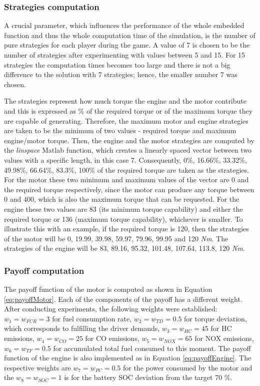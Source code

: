 \subsubsection{Strategies computation}
A crucial parameter, which influences the performance of the whole embedded function and thus the whole computation time of the simulation, is the number of pure strategies for each player during the game. A value of 7 is chosen to be the number of strategies after experimenting with values between 5 and 15. For 15 strategies the computation times becomes too large and there is not a big difference to the solution with 7 strategies; hence, the smaller number 7 was chosen.

The strategies represent how much torque the engine and the motor contribute and this is expressed as \% of the required torque or of the maximum torque they are capable of generating. Therefore, the maximum motor and engine strategies are taken to be the minimum of two values - required torque and maximum engine/motor torque. Then, the engine and the motor strategies are computed by the \textit{linspace} Matlab function, which creates a linearly spaced vector between two values with a specific length, in this case 7. Consequently, 0\%, 16.66\%, 33.32\%, 49.98\%, 66.64\%, 83.3\%, 100\% of the required torque are taken as the strategies. For the motor these two minimum and maximum values of the vector are 0 and the required torque respectively, since the motor can produce any torque between 0 and 400, which is also the maximum torque that can be requested. For the engine these two values are 83 (its minimum torque capability) and either the required torque or 136 (maximum torque capability), whichever is smaller. To illustrate this with an example, if the required torque is 120, then the strategies of the motor will be 0, 19.99, 39.98, 59.97, 79.96, 99.95 and 120 \textit{Nm}. The strategies of the engine will be 83, 89.16, 95.32, 101.48, 107.64, 113.8, 120 \textit{Nm}. 

\subsubsection{Payoff computation}
The payoff function of the motor is computed as shown in Equation \ref{eq:payoffMotor}. Each of the components of the payoff has a different weight. After conducting experiments, the following weights were established: $w_1 = w_{FCR} = 3$ for fuel consumption rate, $w_2 = w_{TD} = 0.5$ for torque deviation, which corresponds to fulfilling the driver demands, $w_3 = w_{HC} = 45$ for HC emissions, $w_4 = w_{CO} = 25$ for CO emissions, $w_5 = w_{NOX} = 65$ for NOX emissions, $w_6 = w_{TF} = 0.5$ for accumulated total fuel consumed to this moment.
The payoff function of the engine is also implemented as in Equation \ref{eq:payoffEngine}. The respective weights are $w_7 = w_{PC} = 0.5$ for the power consumed by the motor and the $w_8 = w_{SOC} = 1$ is for the battery SOC deviation from the target 70 \%.


